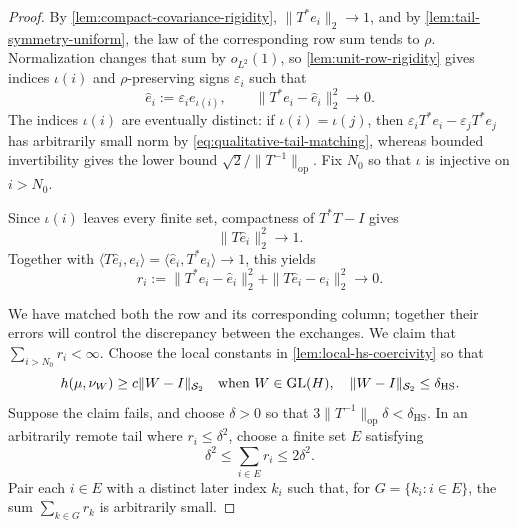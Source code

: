 \begin{proof}
By \cref{lem:compact-covariance-rigidity}, $\|T^*e_i\|_2\to1$, and by
\cref{lem:tail-symmetry-uniform}, the law of the corresponding row sum tends
to $\rho$.  Normalization changes that sum by $o_{L^2}(1)$, so
\cref{lem:unit-row-rigidity} gives indices $\iota(i)$ and $\rho$-preserving
signs $\varepsilon_i$ such that
\begin{equation}
 \widehat e_i:=\varepsilon_i e_{\iota(i)},\qquad
 \|T^*e_i-\widehat e_i\|_2^2\longrightarrow0.
 \label{eq:qualitative-tail-matching}
 \end{equation}
The indices $\iota(i)$ are eventually distinct: if
$\iota(i)=\iota(j)$, then
$\varepsilon_iT^*e_i-\varepsilon_jT^*e_j$ has arbitrarily small norm
by \eqref{eq:qualitative-tail-matching}, whereas bounded
invertibility gives the lower bound $\sqrt2/\|T^{-1}\|_{\mathrm{op}}$.
Fix $N_0$ so that $\iota$ is injective on $i>N_0$.

Since $\iota(i)$ leaves every finite set, compactness of $T^*T-I$ gives
\[
 \|T\widehat e_i\|_2^2\longrightarrow1.
\]
Together with $\langle T\widehat e_i,e_i\rangle
=\langle\widehat e_i,T^*e_i\rangle\to1$, this yields
\begin{equation}
 r_i:=\|T^*e_i-\widehat e_i\|_2^2
       +\|T\widehat e_i-e_i\|_2^2\longrightarrow0.
\end{equation}

We have matched both the row and its corresponding column; together their
errors will control the discrepancy between the exchanges. We claim that
$\sum_{i>N_0}r_i<\infty$. Choose the local
constants in \cref{lem:local-hs-coercivity} so that
\begin{equation}
 h(\mu,\nu_W)\geq c\|W-I\|_{\mathcal S_2}
 \quad\text{when }W\in\operatorname{GL}(H),\quad
 \|W-I\|_{\mathcal S_2}\leq\delta_{\mathrm{HS}}.
 \label{eq:local-lower-used}
\end{equation}
Suppose the claim fails, and choose $\delta>0$ so that
$3\|T^{-1}\|_{\mathrm{op}}\delta<\delta_{\mathrm{HS}}$.
In an arbitrarily remote tail where $r_i\le\delta^2$, choose
a finite set $E$ satisfying
\begin{equation}
 \delta^2\leq\sum_{i\in E}r_i\leq2\delta^2.
 \label{eq:active-tail-error}
\end{equation}
Pair each $i\in E$ with a distinct later index $k_i$ such that, for
$G=\{k_i:i\in E\}$, the sum $\sum_{k\in G}r_k$ is
arbitrarily small.


\end{proof}
